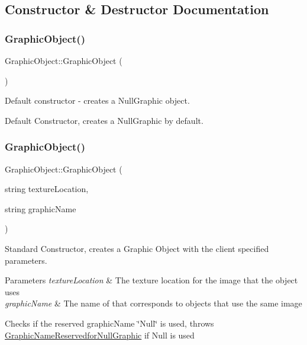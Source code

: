 \subsection{Constructor \& Destructor Documentation}
\mbox{\label{class_graphic_object_ae1b56ae4484ad120f5ba77c0b683a045}} 
\subsubsection{\texorpdfstring{Graphic\+Object()}{GraphicObject()}\hspace{0.1cm}{\footnotesize\ttfamily [1/2]}}
{\footnotesize\ttfamily Graphic\+Object\+::\+Graphic\+Object (\begin{DoxyParamCaption}{ }\end{DoxyParamCaption})}



Default constructor -\/ creates a Null\+Graphic object. 

Default Constructor, creates a Null\+Graphic by default. \mbox{\label{class_graphic_object_a9819ca0b4c1bb72ede070d8485bfc8a9}} 
\subsubsection{\texorpdfstring{Graphic\+Object()}{GraphicObject()}\hspace{0.1cm}{\footnotesize\ttfamily [2/2]}}
{\footnotesize\ttfamily Graphic\+Object\+::\+Graphic\+Object (\begin{DoxyParamCaption}\item[{string}]{texture\+Location,  }\item[{string}]{graphic\+Name }\end{DoxyParamCaption})}



Standard Constructor, creates a Graphic Object with the client specified parameters. 


\begin{DoxyParams}{Parameters}
{\em texture\+Location} & The texture location for the image that the object uses \\
\hline
{\em graphic\+Name} & The name of that corresponds to objects that use the same image\\
\hline
\end{DoxyParams}
Checks if the reserved graphic\+Name \char`\"{}\+Null\char`\"{} is used, throws \hyperlink{class_graphic_name_reservedfor_null_graphic}{Graphic\+Name\+Reservedfor\+Null\+Graphic} if Null is used 

